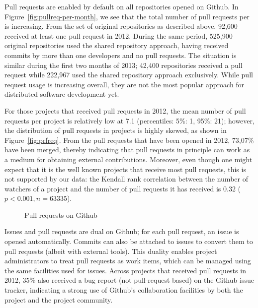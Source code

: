 \documentclass{acm_proc_article-sp}
\begin{document}
Pull requests are enabled by default on all repositories opened on Github.  In
Figure~\ref{fig:pullreq-per-month}, we see that the total number of pull
requests per is increasing. From the set of original repositories as described
above, 92,600 received at least one pull request in 2012. During the same
period, 525,900 original repositories used the shared repository approach,
having received commits by more than one developers and no pull requests. The
situation is similar during the first two months of 2013; 42,400 repositories
received a pull request while 222,967 used the shared repository approach
exclusively. While pull request usage is increasing overall, they are not the
most popular approach for distributed software development yet.

For those projects that received pull requests in 2012, the mean number of pull
requests per project is relatively low at 7.1 (percentiles: 5\%: 1, 95\%: 21);
however, the distribution of pull requests in projects is highly skewed, as
shown in Figure~\ref{fig:prfreq}.
From the pull requests that have been opened in 2012, 73,07\% have been merged,
thereby indicating that pull requests in principle can work as a medium for
obtaining external contributions. Moreover, even though one might expect that it
is the well known projects that receive most pull requests, this is not
supported by our data: the Kendall rank correlation between the number of
watchers of a project and the number of pull requests it has received is 0.32
($p < 0.001, n = 63335$).

\begin{figure}
  \centering
{}
\caption{Pull requests on Github}
\end{figure}

Issues and pull requests are dual on Github; for each pull request, an issue is
opened automatically. Commits can also be attached to issues to convert them to
pull requests (albeit with external tools). This duality enables project
administrators to treat pull requests as work items, which can be managed using
the same facilities used for issues. Across projects that received pull
requests in 2012, 35\% also received a bug report (not pull-request based) 
on the Github issue tracker, indicating a strong use of Github's collaboration
facilities by both the project and the project community.
\end{document}
